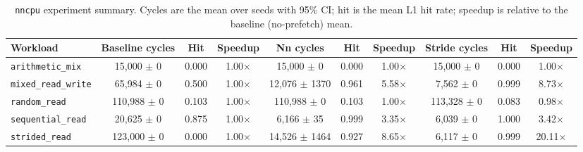 \begin{table}[t]
  \centering
  \caption{\texttt{nncpu} experiment summary.  Cycles are the
  mean over seeds with 95\% CI; hit is the mean L1 hit rate;
  speedup is relative to the baseline (no-prefetch) mean.
  \label{tab:results}}
  \begin{tabular}{lccccccccc}
    \textbf{Workload} & \textbf{Baseline cycles} & \textbf{Hit} & \textbf{Speedup} & \textbf{Nn cycles} & \textbf{Hit} & \textbf{Speedup} & \textbf{Stride cycles} & \textbf{Hit} & \textbf{Speedup} \\
    \midrule
    \texttt{arithmetic_mix} & 15,000 $\pm$ 0 & 0.000 & 1.00$\times$ & 15,000 $\pm$ 0 & 0.000 & 1.00$\times$ & 15,000 $\pm$ 0 & 0.000 & 1.00$\times$ \\
    \texttt{mixed_read_write} & 65,984 $\pm$ 0 & 0.500 & 1.00$\times$ & 12,076 $\pm$ 1370 & 0.961 & 5.58$\times$ & 7,562 $\pm$ 0 & 0.999 & 8.73$\times$ \\
    \texttt{random_read} & 110,988 $\pm$ 0 & 0.103 & 1.00$\times$ & 110,988 $\pm$ 0 & 0.103 & 1.00$\times$ & 113,328 $\pm$ 0 & 0.083 & 0.98$\times$ \\
    \texttt{sequential_read} & 20,625 $\pm$ 0 & 0.875 & 1.00$\times$ & 6,166 $\pm$ 35 & 0.999 & 3.35$\times$ & 6,039 $\pm$ 0 & 1.000 & 3.42$\times$ \\
    \texttt{strided_read} & 123,000 $\pm$ 0 & 0.000 & 1.00$\times$ & 14,526 $\pm$ 1464 & 0.927 & 8.65$\times$ & 6,117 $\pm$ 0 & 0.999 & 20.11$\times$ \\
    \bottomrule
  \end{tabular}
\end{table}
